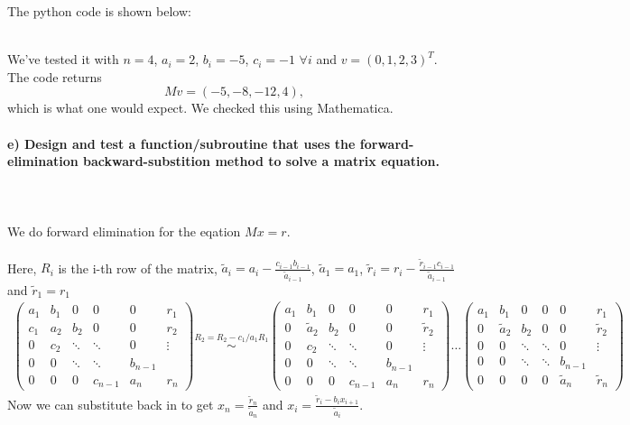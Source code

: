     The python code is shown below:
    
    \ \\
    We've tested it with $n=4$, $a_i = 2$, $b_i = -5$,
    $c_i = -1$ $ \forall i$ and $v = (0,1,2,3)^T$. The code returns
    \begin{equation}
    	Mv = (-5, -8, -12, 4),
    \end{equation}
    which is what one would expect. We checked this using Mathematica. \\

\newpage
\paragraph{
    e) Design and test a function/subroutine that uses the
    forward-elimination backward-substition method to solve a matrix
    equation.
} \ \\
    \\
    We do forward elimination for the eqation $Mx = r$. \\
    \\
    Here, $R_i$ is the i-th row of the matrix,
    $\tilde{a}_i = a_i - \frac{c_{i-1} b_{i-1}}{\tilde{a}_{i-1}}$,
    $\tilde{a}_1 = a_1$,
    $\tilde{r}_i = r_i - \frac{\tilde{r}_{i-1} c_{i-1}}{\tilde{a}_{i-1}}$ and
    $\tilde{r}_1 = r_1$ \\
    \begin{align}
	\begin{pmatrix}
	a_1 & b_1 & 0      & 0       & 0   & r_1\\
	c_1 & a_2 & b_2    & 0       & 0 & r_2\\
	0   & c_2 & \ddots & \ddots  & 0 & \vdots\\
	0   & 0   & \ddots & \ddots  & b_{n-1} &\\
	0   & 0   & 0      & c_{n-1} & a_n& r_n
	\end{pmatrix}
	\overset{R_2 = R_2 - c_1/a_1 R_1}{\sim}
	\begin{pmatrix}
	a_1 & b_1 & 0      & 0       & 0   & r_1\\
	0 & \tilde{a}_2 & b_2    & 0       & 0 & \tilde{r}_2\\
	0   & c_2 & \ddots & \ddots  & 0 & \vdots\\
	0   & 0   & \ddots & \ddots  & b_{n-1} &\\
	0   & 0   & 0      & c_{n-1} & a_n& r_n
	\end{pmatrix}
	\dots
	\begin{pmatrix}
	a_1 & b_1 & 0      & 0       & 0   & r_1\\
	0 & \tilde{a}_2 & b_2    & 0       & 0 & \tilde{r}_2\\
	0   & 0 & \ddots & \ddots  & 0 & \vdots\\
	0   & 0   & \ddots & \ddots  & b_{n-1} &\\
	0   & 0   & 0      & 0 & \tilde{a}_n& \tilde{r}_n
	\end{pmatrix}
    \end{align}
    Now we can substitute back in to get
    $x_n = \frac{\tilde{r}_n}{\tilde{a}_n} $ and
    $x_i = \frac{\tilde{r}_{i} - b_{i} x_{i+1}}{\tilde{a}_{i}}$.

